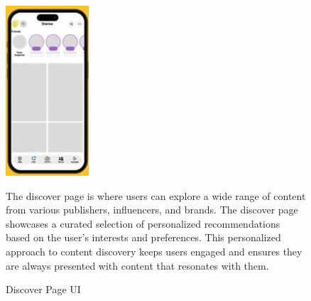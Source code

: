 \documentclass{article}
\begin{document}
\begin{figure}[h]
    \begin{minipage}{0.15\textwidth} 
        \includegraphics[width=\linewidth]{discover.jpg} 
        \caption{Discover Page UI}
        \label{fig:discover page}
    \end{minipage}
    \begin{minipage}{0.80\textwidth} 
        The discover page is where users can explore a wide range of content from various publishers, influencers, and brands. The discover page showcases a curated selection of personalized recommendations based on the user’s interests and preferences. This personalized approach to content discovery keeps users engaged and ensures they are always presented with content that resonates with them. \newline
    \end{minipage}
\end{figure}
\end{document}
